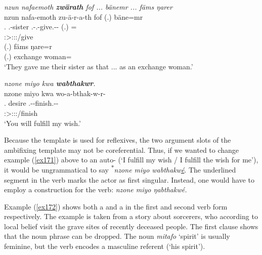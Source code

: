 \begin{exe}
	\ex \emph{nzun nafaemoth \textbf{zwärath} fof ... bänemr ... fäms ŋarer}\\
	\glll nzun nafa-emoth zu-ä-r-a-th fof (.) bäne=mr\\
	\Fsg.\Dat{} \Third.\Poss-sister \Fsg.\Gam-\Vc.\Ndu-give.\Rs-\Pst-\Stnsg{} \Emph{} (.) \Recog=\Purp{}\\
	{} {} \footnotesize{\Stpl:\Sbj>\Fsg:\Io:\Pst:\Pfv/give} {} {} {} {} {}\\
	\sn
	\gll (.) fäms ŋare=r\\
	(.) exchange woman=\Purp\\
	\trans `They gave me their sister as that ... as an exchange woman.'\\
	\label{ex173}
\end{exe}
\begin{exe}
	\ex \emph{nzone miyo kwa \textbf{wabthakwr}.}\\
	\glll nzone miyo kwa wo-a-bthak-w-r-\Zero{}\\
	\Fsg.\Poss{} desire \Fut{} \Fsg.\Alph-\Vc-finish.\Ext-\Lk-\Stsg{}\\
	{} {} {} \footnotesize{\Stsg:\Sbj>\Fsg:\Io:\Nonpast:\Ipfv/finish}\\
	\trans `You will fulfill my wish.'
	\label{ex171}
\end{exe}

Because the  template is used for reflexives, the two argument slots of the ambifixing template may not be coreferential. Thus, if we wanted to change example (\ref{ex171}) above to an auto- (`I fulfill my wish / I fulfill the wish for me'), it would be ungrammatical to say \textsuperscript{$\ast$}\emph{nzone miyo wabthakw\uline{é}}. The underlined segment in the verb marks the actor as first singular. Instead, one would have to employ a  construction for the verb: \emph{nzone miyo ŋabthakwé.}%

Example (\ref{ex172}) shows both a  and a  in the first and second verb form respectively. The example is taken from a story about sorcerers, who \textendash{} according to local belief \textendash{} visit the grave sites of recently deceased people. The first clause shows that the  noun phrase can be dropped. The noun \emph{mitafo} `spirit' is usually feminine, but the verb encodes a masculine referent (`his spirit').


